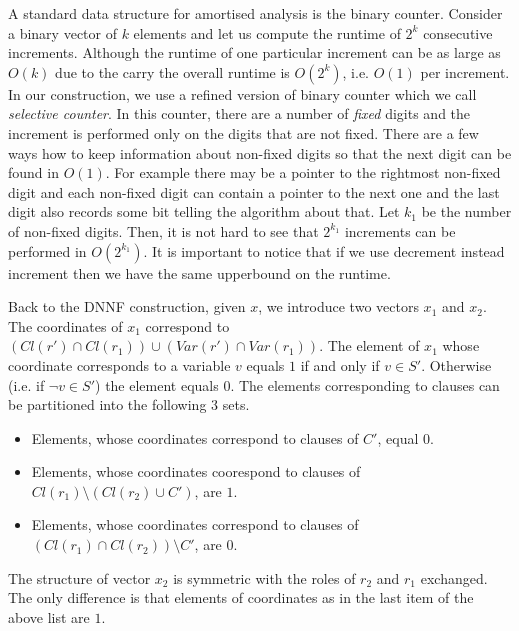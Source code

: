 \documentclass{llncs}
\begin{document}
A standard data structure for amortised analysis is the binary counter. Consider a binary vector of $k$ elements
and let us compute the runtime of $2^k$ consecutive increments. Although the runtime of one particular increment
can be as large as $O(k)$ due to the carry the overall runtime is $O(2^k)$, i.e. $O(1)$ per increment.
In our construction, we use a refined version of binary counter which we call \emph{selective counter}.
In this counter, there are a number of \emph{fixed} digits and the increment is performed only on the digits
that are not fixed. There are a few ways how to keep information about non-fixed digits so that the next digit
can be found in $O(1)$. For example there may be a pointer to the rightmost non-fixed digit and each non-fixed
digit can contain a pointer to the next one and the last digit also records some bit telling the algorithm about
that.  Let $k_1$ be the number of non-fixed digits. Then, it is not hard to see that $2^{k_1}$ increments can
be performed in $O(2^{k_1})$. It is important to notice that if we use decrement instead increment then we have
the same upperbound on the runtime.

Back to the DNNF construction, given $x$, we introduce two vectors $x_1$ and $x_2$. The coordinates of $x_1$
correspond to $(Cl(r') \cap Cl(r_1)) \cup (Var(r') \cap Var(r_1))$. The element of $x_1$ whose coordinate 
corresponds to a variable $v$ equals $1$ if and only if $v \in S'$. Otherwise (i.e. if $\neg v \in S'$) the element 
equals $0$. The elements corresponding to clauses can be partitioned into the following $3$ sets.
\begin{itemize}
\item Elements, whose coordinates correspond to clauses of $C'$, equal $0$. 
\item Elements, whose coordinates coorespond to clauses of $Cl(r_1) \setminus (Cl(r_2) \cup C')$, are $1$.
\item Elements, whose coordinates correspond to clauses of $(Cl(r_1) \cap Cl(r_2)) \setminus C'$, are $0$.
\end{itemize}

The structure of vector $x_2$ is symmetric with the roles of $r_2$ and $r_1$ exchanged. The only difference is
that elements of coordinates as in the last item of the above list are $1$. 
\end{document}
